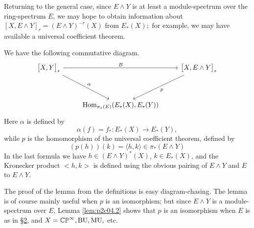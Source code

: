 \documentclass[../main]{subfiles}
\begin{document}
Returning to the general case, since $E\wedge Y$ is at least a module-spectrum over the ring-spectrum $E$, we may hope to obtain information about $[X,E\wedge Y]_r=(E\wedge Y)^{-r}(X)$ from $E_\ast(X);$ for example, we may have available a universal coefficient theorem.

\begin{lemma}
\label{lem:p2c06.2}
We have the following commutative diagram.
\[\begin{tikzcd}
\bigl[X,Y\bigr]_\ast && \bigl[X,E\wedge Y\bigr]_\ast \\
\\
&\operatorname{Hom}_{\pi_\ast(E)}(E_\ast(X),E_\ast(Y))
\arrow["\alpha", from=1-1, to=3-2]
\arrow["B", from=1-1, to=1-3]
\arrow["p", from=1-3, to=3-2]
\end{tikzcd}\]
Here $\alpha$ is defined by 
\[\alpha(f)=f_\ast:E_\ast(X)\longrightarrow E_\ast(Y),\]
while $p$ is the homomorphism of the universal coefficient theorem, defined by 
\[(p(h))(k)=\langle h,k\rangle\in \pi_\ast(E\wedge Y)\]
In the last formula we have $h\in(E\wedge Y)^\ast(X)$, $k\in E_\ast(X)$, and the Kronecker product $<h,k>$ is defined using the obvious pairing of $E\wedge Y$ and $E$ to $E\wedge Y$.
\end{lemma}

The proof of the lemma from the definitions is easy diagram-chasing. The lemma is of course mainly useful when $p$ is an isomorphism; but since $E\wedge Y$ is a module-spectrum over $E$, Lemma \ref{lem:p2c04.2} shows that $p$ is an isomorphism when $E$ is as in \hyperref[sec:p2c2]{\S 2}, and $X=\mathbb{CP}^\infty, \mathrm{BU}, \mathrm{MU},$ etc.
\end{document}
